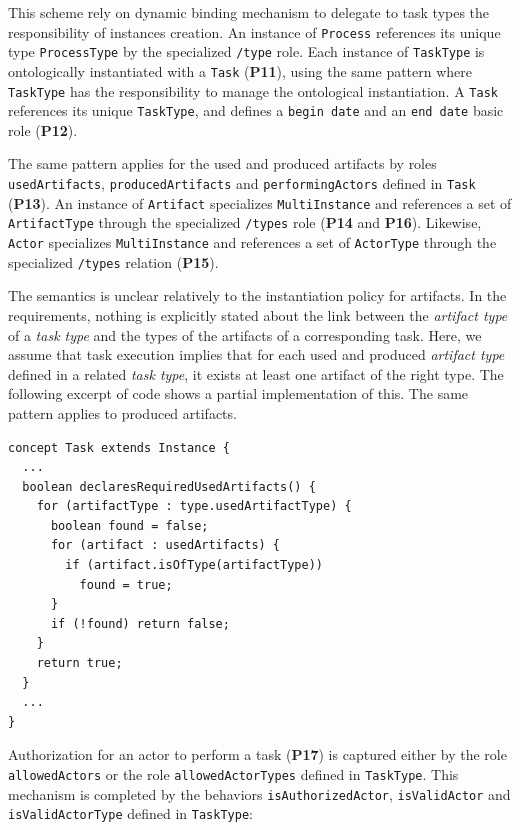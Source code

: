 This scheme rely on \FML dynamic binding mechanism to delegate to task types the responsibility of instances creation. An instance of \texttt{Process} references its unique type \texttt{ProcessType} by the specialized \texttt{/type} role. Each instance of \texttt{TaskType} is ontologically instantiated with a \texttt{Task} (\textbf{P11}), using the same pattern where \texttt{TaskType} has the responsibility to manage the ontological instantiation. A \texttt{Task} references its unique \texttt{TaskType}, and defines a \texttt{begin date} and an \texttt{end date} basic role (\textbf{P12}).

The same pattern applies for the used and produced artifacts by roles \texttt{usedArtifacts}, \texttt{producedArtifacts} and \texttt{performingActors} defined in \texttt{Task} (\textbf{P13}). An instance of \texttt{Artifact} specializes \texttt{MultiInstance} and references a set of \texttt{ArtifactType} through the specialized \texttt{/types} role (\textbf{P14} and \textbf{P16}). Likewise, \texttt{Actor} specializes \texttt{MultiInstance} and references a set of \texttt{ActorType} through the specialized \texttt{/types} relation (\textbf{P15}).

The semantics is unclear relatively to the instantiation policy for artifacts. In the requirements, nothing is explicitly stated about the link between the \emph{artifact type} of a \emph{task type} and the types of the artifacts of a corresponding task.
Here, we assume that task execution implies that for each used and produced \emph{artifact type} defined in a related \emph{task type}, it exists at least one artifact of the right type. The following excerpt of \FML code shows a partial implementation of this. The same pattern applies to produced artifacts.

\begin{lstlisting}
concept Task extends Instance {
  ...
  boolean declaresRequiredUsedArtifacts() {
    for (artifactType : type.usedArtifactType) {
      boolean found = false;
      for (artifact : usedArtifacts) {
        if (artifact.isOfType(artifactType))
          found = true;
      }
      if (!found) return false;
    }
    return true;
  }
  ...
}
\end{lstlisting}

Authorization for an actor to perform a task (\textbf{P17}) is captured either by the role \texttt{allowedActors} or the role \texttt{allowedActorTypes} defined in \texttt{TaskType}. This mechanism is completed by the behaviors \texttt{isAuthorizedActor}, \texttt{isValidActor} and \texttt{isValidActorType} defined in \texttt{TaskType}:

